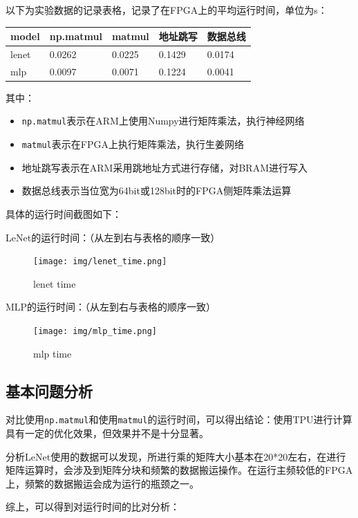\documentclass[12pt,a4paper]{article}
\begin{document}
以下为实验数据的记录表格，记录了在FPGA上的平均运行时间，单位为s：

\begin{longtable}[]{@{}lllll@{}}
\toprule\noalign{}
model & np.matmul & matmul & 地址跳写 & 数据总线 \\
\midrule\noalign{}
\endhead
\bottomrule\noalign{}
\endlastfoot
lenet & 0.0262 & 0.0225 & 0.1429 & 0.0174 \\
mlp & 0.0097 & 0.0071 & 0.1224 & 0.0041 \\
\end{longtable}

其中：

\begin{itemize}
\item
  \texttt{np.matmul}表示在ARM上使用Numpy进行矩阵乘法，执行神经网络
\item
  \texttt{matmul}表示在FPGA上执行矩阵乘法，执行生姜网络
\item
  地址跳写表示在ARM采用跳地址方式进行存储，对BRAM进行写入
\item
  数据总线表示当位宽为64bit或128bit时的FPGA侧矩阵乘法运算
\end{itemize}

具体的运行时间截图如下：

LeNet的运行时间：（从左到右与表格的顺序一致）

\begin{figure}[htbp]
  \centering
  \texttt{[image: img/lenet\_time.png]}
  \caption{lenet time}
\end{figure} 

MLP的运行时间：（从左到右与表格的顺序一致）

\begin{figure}[htbp]
  \centering
  \texttt{[image: img/mlp\_time.png]}
  \caption{mlp time}
\end{figure} 

\subsection{基本问题分析}

对比使用\texttt{np.matmul}和使用\texttt{matmul}的运行时间，可以得出结论：使用TPU进行计算具有一定的优化效果，但效果并不是十分显著。

分析LeNet使用的数据可以发现，所进行乘的矩阵大小基本在20*20左右，在进行矩阵运算时，会涉及到矩阵分块和频繁的数据搬运操作。在运行主频较低的FPGA上，频繁的数据搬运会成为运行的瓶颈之一。

综上，可以得到对运行时间的比对分析：
\end{document}
